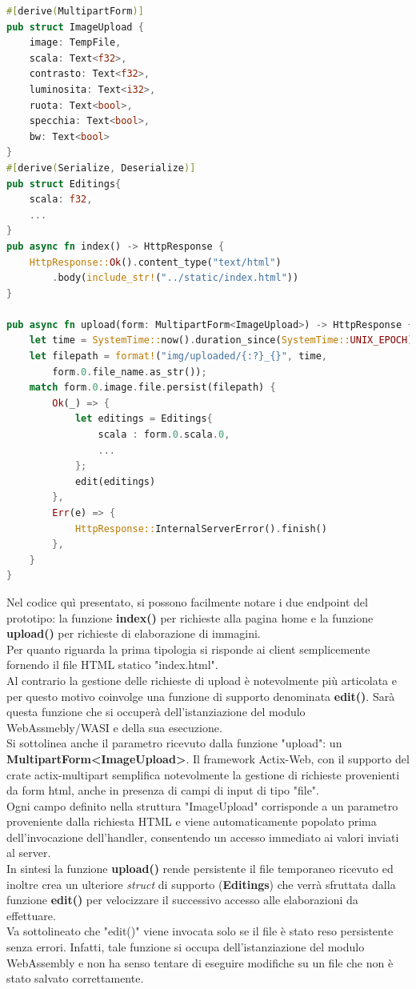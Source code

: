 \begin{lstlisting}[language=Rust,caption={Operazioni principali presenti nel file handlers.rs}, showstringspaces=false]
#[derive(MultipartForm)]
pub struct ImageUpload {
    image: TempFile,
    scala: Text<f32>,
    contrasto: Text<f32>,
    luminosita: Text<i32>,
    ruota: Text<bool>,
    specchia: Text<bool>,
    bw: Text<bool>
}
#[derive(Serialize, Deserialize)]
pub struct Editings{
    scala: f32,
    ...
}
pub async fn index() -> HttpResponse {
    HttpResponse::Ok().content_type("text/html")
        .body(include_str!("../static/index.html"))
}

pub async fn upload(form: MultipartForm<ImageUpload>) -> HttpResponse {
    let time = SystemTime::now().duration_since(SystemTime::UNIX_EPOCH);
    let filepath = format!("img/uploaded/{:?}_{}", time, 
        form.0.file_name.as_str());
    match form.0.image.file.persist(filepath) {
        Ok(_) => {
            let editings = Editings{
                scala : form.0.scala.0,
                ...
            };
            edit(editings)
        },
        Err(e) => {
            HttpResponse::InternalServerError().finish()
        },
    }
}
\end{lstlisting}
Nel codice quì presentato, si possono facilmente notare i due endpoint del prototipo: la funzione \textbf{index()} per richieste alla pagina home e la funzione \textbf{upload()} per richieste di elaborazione di immagini.
\\Per quanto riguarda la prima tipologia si risponde ai client semplicemente fornendo il file HTML statico "index.html".
\\Al contrario la gestione delle richieste di upload è notevolmente più articolata e per questo motivo coinvolge una funzione di supporto denominata \textbf{edit()}. Sarà questa funzione che si occuperà dell'istanziazione del modulo WebAssmebly/WASI e della sua esecuzione.
\\Si sottolinea anche il parametro ricevuto dalla funzione "upload": un \textbf{MultipartForm<ImageUpload>}.
Il framework Actix-Web, con il supporto del crate actix-multipart semplifica notevolmente la gestione di richieste provenienti da form html, anche in presenza di campi di input di tipo "file".
\\Ogni campo definito nella struttura "ImageUpload" corrisponde a un parametro proveniente dalla richiesta HTML e viene automaticamente popolato prima dell'invocazione dell'handler, consentendo un accesso immediato ai valori inviati al server.
\\In sintesi la funzione \textbf{upload()} rende persistente il file temporaneo ricevuto ed inoltre crea un ulteriore \emph{struct} di supporto (\textbf{Editings}) che verrà sfruttata dalla funzione \textbf{edit()} per velocizzare il successivo accesso alle elaborazioni da effettuare.
\\Va sottolineato che "edit()" viene invocata solo se il file è stato reso persistente senza errori. Infatti, tale funzione si occupa dell'istanziazione del modulo WebAssembly e non ha senso tentare di eseguire modifiche su un file che non è stato salvato correttamente.
